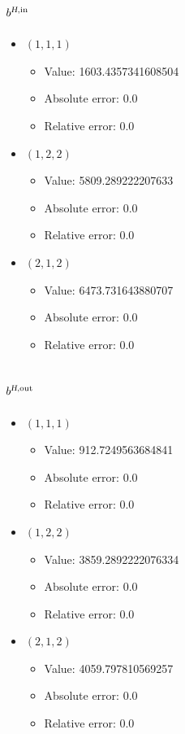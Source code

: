 \documentclass{article}%
\begin{document}
\subsection{$b^{\textsl{H},\text{in}}$}%
\begin{itemize}%
	\item $(1, 1, 1)$%
	\begin{itemize}%
		\item Value: 1603.4357341608504%
		\item Absolute error: 0.0%
		\item Relative error: 0.0%
	\end{itemize}%
	\item $(1, 2, 2)$%
	\begin{itemize}%
		\item Value: 5809.289222207633%
		\item Absolute error: 0.0%
		\item Relative error: 0.0%
	\end{itemize}%
	\item $(2, 1, 2)$%
	\begin{itemize}%
		\item Value: 6473.731643880707%
		\item Absolute error: 0.0%
		\item Relative error: 0.0%
	\end{itemize}%
\end{itemize}%
\subsection{$b^{\textsl{H},\text{out}}$}%
\begin{itemize}%
	\item $(1, 1, 1)$%
	\begin{itemize}%
		\item Value: 912.7249563684841%
		\item Absolute error: 0.0%
		\item Relative error: 0.0%
	\end{itemize}%
	\item $(1, 2, 2)$%
	\begin{itemize}%
		\item Value: 3859.2892222076334%
		\item Absolute error: 0.0%
		\item Relative error: 0.0%
	\end{itemize}%
	\item $(2, 1, 2)$%
	\begin{itemize}%
		\item Value: 4059.797810569257%
		\item Absolute error: 0.0%
		\item Relative error: 0.0%
	\end{itemize}%
\end{itemize}%
\end{document}
